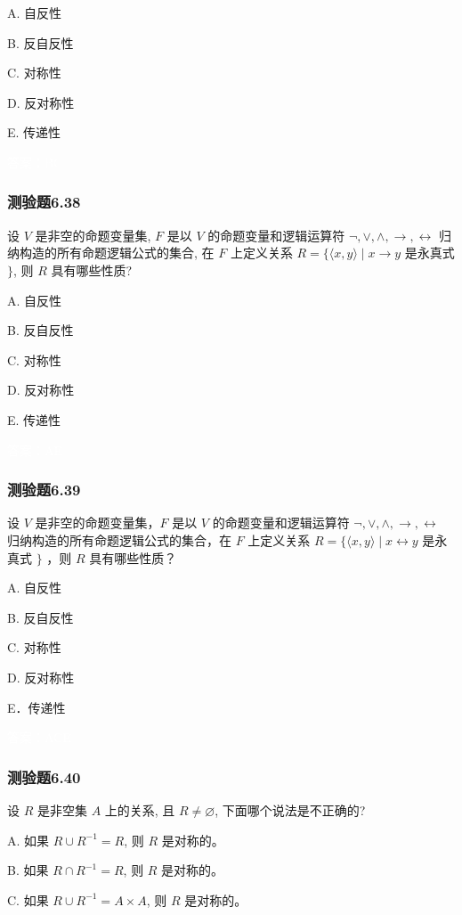 \documentclass[UTF8, heading=true]{ctexart}
\begin{document}
A. 
自反性

B. 
反自反性

C. 
对称性

D. 
反对称性

E. 
传递性

\textcolor{white}{答案：BC}

\subsubsection{测验题6.38}

设 $V$ 是非空的命题变量集, $F$ 是以 $V$ 的命题变量和逻辑运算符 $\neg, \vee, \wedge, \rightarrow, \leftrightarrow$ 归纳构造的所有命题逻辑公式的集合, 在 $F$ 上定义关系 $R=\{\langle x, y\rangle \mid x \rightarrow y$ 是永真式 $\}$, 则 $R$ 具有哪些性质?

A. 自反性

B. 反自反性

C. 对称性

D. 反对称性

E. 传递性

\textcolor{white}{答案：AE}

\subsubsection{测验题6.39}


设 $V$ 是非空的命题变量集，$F$ 是以 $V$ 的命题变量和逻辑运算符 $\neg, \vee, \wedge, \rightarrow, \leftrightarrow$ 归纳构造的所有命题逻辑公式的集合，在 $F$ 上定义关系 $R=\{\langle x, y\rangle \mid x \leftrightarrow y$ 是永真式 $\}$ ，则 $R$ 具有哪些性质？

A. 自反性

B. 反自反性

C. 对称性

D.  反对称性

E．传递性

\textcolor{white}{答案：ACE}

\subsubsection{测验题6.40}
设 $R$ 是非空集 $A$ 上的关系, 且 $R \neq \varnothing$, 下面哪个说法是不正确的?

A. 如果 $R \cup R^{-1}=R$, 则 $R$ 是对称的。

B. 如果 $R \cap R^{-1}=R$, 则 $R$ 是对称的。

C. 如果 $R \cup R^{-1}=A \times A$, 则 $R$ 是对称的。
\end{document}
